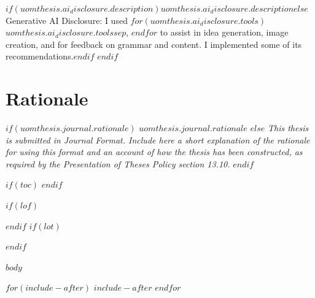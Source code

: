 \documentclass[$if(fontsize)$$fontsize$,$endif$a4paper]{report}
\begin{document}
$if(uomthesis.ai_disclosure.description)$$uomthesis.ai_disclosure.description$$else$Generative AI Disclosure: I used $for(uomthesis.ai_disclosure.tools)$$uomthesis.ai_disclosure.tools$$sep$, $endfor$ to assist in idea generation, image creation, and for feedback on grammar and content. I implemented some of its recommendations.$endif$
$endif$

\chapter*{Rationale}

$if(uomthesis.journal.rationale)$
$uomthesis.journal.rationale$
$else$
\emph{This thesis is submitted in Journal Format. Include here a short explanation of the rationale for using this format and an account of how the thesis has been constructed, as required by the Presentation of Theses Policy section 13.10.}
$endif$

$if(toc)$
\setcounter{tocdepth}{$toc-depth$}
\tableofcontents
$endif$

$if(lof)$\listoffigures$endif$
$if(lot)$\listoftables$endif$

$body$

$for(include-after)$
$include-after$
$endfor$
\end{document}
